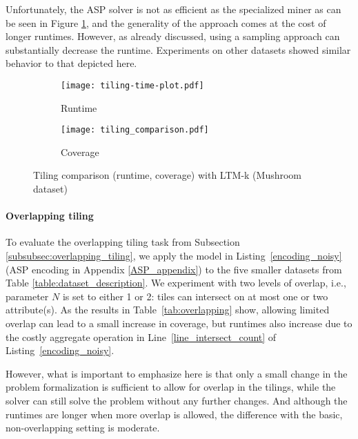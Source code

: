 Unfortunately, the ASP solver is not as efficient as the specialized miner as can be seen in Figure \ref{fig:tiling_time_comparison}, and the generality of the approach comes at the cost of longer runtimes. However, as already discussed, using a sampling approach can substantially decrease the runtime. Experiments on other datasets showed similar behavior to that depicted here.

\begin{figure}[t]
      \captionsetup{
                 }
  \begin{center}
    \begin{subfigure}{.49\textwidth}
      \texttt{[image: tiling-time-plot.pdf]}
      \caption{Runtime}
      \label{fig:tiling_time_comparison}
    \end{subfigure}
    \hfill 
    \begin{subfigure}{.49\textwidth}
      \texttt{[image: tiling\_comparison.pdf]}
      \caption{Coverage}
      \label{fig:tiling_comparison}
    \end{subfigure}
  \caption{Tiling comparison (runtime, coverage) with LTM-k (Mushroom dataset)}
  \end{center}
\end{figure}

\paragraph{Overlapping tiling}
To evaluate the overlapping tiling task from Subsection \ref{subsubsec:overlapping_tiling}, we apply the model in Listing~\ref{encoding_noisy} (ASP encoding in Appendix \ref{ASP_appendix}) to the five smaller datasets from Table \ref{table:dataset_description}. We experiment with two levels of overlap, i.e., parameter $N$ is set to either 1 or 2: tiles can intersect on at most one or two attribute(s). As the results in Table~\ref{tab:overlapping} show, allowing limited overlap can lead to a small increase in coverage, but runtimes also increase due to the costly aggregate operation in Line~\ref{line_intersect_count} of Listing~\ref{encoding_noisy}. 

However, what is important to emphasize here is that only a small change in the problem formalization is sufficient to allow for overlap in the tilings, while the solver can still solve the problem without any further changes. And although the runtimes are longer when more overlap is allowed, the difference with the basic, non-overlapping setting is moderate.

